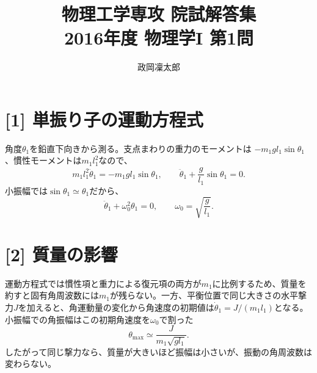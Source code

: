 \documentclass[11pt,a4paper]{article}
\title{物理工学専攻 院試解答集\\2016年度 物理学I 第1問}
\author{政岡凜太郎}
\date{}
\begin{document}
\maketitle

\section*{[1] 単振り子の運動方程式}
角度$\theta_1$を鉛直下向きから測る。支点まわりの重力のモーメントは
$-m_1gl_1\sin\theta_1$、慣性モーメントは$m_1l_1^2$なので、
\begin{equation}
  m_1l_1^2\ddot{\theta}_1=-m_1gl_1\sin\theta_1,
  \qquad \ddot{\theta}_1+\frac{g}{l_1}\sin\theta_1=0.
\end{equation}
小振幅では$\sin\theta_1\simeq\theta_1$だから、
\begin{equation}
  \ddot{\theta}_1+\omega_0^2\theta_1=0,
  \qquad \boxed{\omega_0=\sqrt{\frac{g}{l_1}}}.
\end{equation}

\section*{[2] 質量の影響}
運動方程式では慣性項と重力による復元項の両方が$m_1$に比例するため、質量を約すと固有角周波数には$m_1$が残らない。一方、平衡位置で同じ大きさの水平撃力$J$を加えると、角運動量の変化から角速度の初期値は$\dot{\theta}_1=J/(m_1l_1)$となる。小振幅での角振幅はこの初期角速度を$\omega_0$で割った
\begin{equation}
  \theta_{\max}\simeq\frac{J}{m_1\sqrt{gl_1}}.
\end{equation}
したがって同じ撃力なら、質量が大きいほど振幅は小さいが、振動の角周波数は変わらない。
\end{document}
